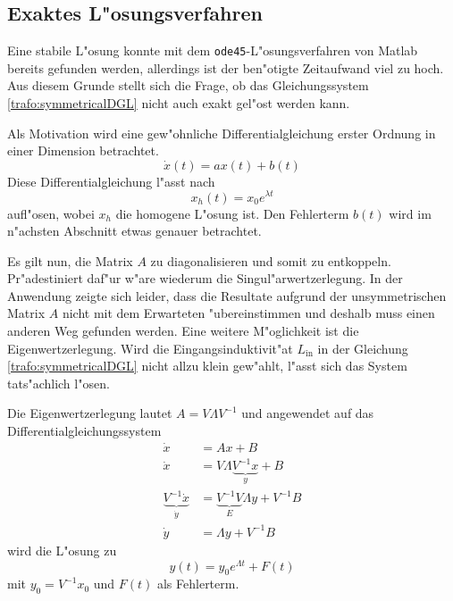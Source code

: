 \begin{refsection}
\subsection{Exaktes L"osungsverfahren}
Eine stabile L"osung konnte mit dem \texttt{ode45}-L"osungsverfahren von Matlab bereits gefunden werden, allerdings ist der ben"otigte Zeitaufwand viel zu hoch. Aus diesem Grunde stellt sich die Frage, ob das Gleichungssystem \ref{trafo:symmetricalDGL} nicht auch exakt gel"ost werden kann.

Als Motivation wird eine gew"ohnliche Differentialgleichung erster Ordnung in einer Dimension betrachtet. 
\begin{equation*}
	\dot{x}(t) = a x(t) + b(t)
	\label{trafo:1D_DGL}
\end{equation*}
Diese Differentialgleichung l"asst nach
\begin{equation*}
	x_h(t) = x_0 e^{\lambda t}
	\label{trafo:homogene_Loesung}
\end{equation*}
aufl"osen, wobei $x_h$ die homogene L"osung ist. Den Fehlerterm $b(t)$ wird im n"achsten Abschnitt etwas genauer betrachtet. 

Es gilt nun, die Matrix $A$ zu diagonalisieren und somit zu entkoppeln. Pr"adestiniert daf"ur w"are wiederum die Singul"arwertzerlegung. In der Anwendung zeigte sich leider, dass die Resultate aufgrund der unsymmetrischen Matrix $A$ nicht mit dem Erwarteten "ubereinstimmen und deshalb muss einen anderen Weg gefunden werden. Eine weitere M"oglichkeit ist die Eigenwertzerlegung. Wird die Eingangsinduktivit"at $L_\mathrm{in}$ in der Gleichung \ref{trafo:symmetricalDGL} nicht allzu klein gew"ahlt, l"asst sich das System tats"achlich l"osen.

Die Eigenwertzerlegung lautet $A = V\Lambda V^{-1}$ und angewendet auf das Differentialgleichungssystem 
\begin{align*}
	\dot{x} &= Ax + B \\
	\dot{x} &= V \Lambda \underbrace{V^{-1} x}_{\displaystyle y} + B \\
	\underbrace{V^{-1} \dot{x}}_{\displaystyle\dot{y}} &= \underbrace{V^{-1}V}_{\displaystyle E} \Lambda y + V^{-1} B \\
	\dot{y} &= \Lambda y + V^{-1} B
\end{align*}
wird die L"osung zu
\begin{equation}
	y(t) = y_0 e^{\Lambda t} + F(t)
	\label{trafo:TransfDGL}
\end{equation}
mit $y_0 = V^{-1}x_0$ und $F(t)$ als Fehlerterm.


\end{refsection}
